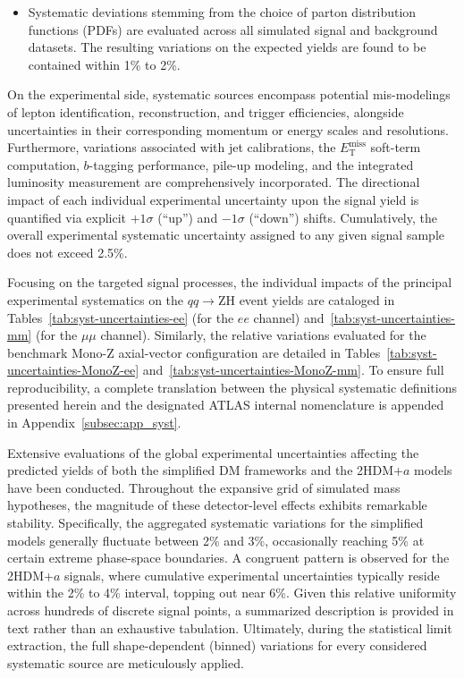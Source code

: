 \begin{itemize}
\item Systematic deviations stemming from the choice of parton distribution functions (PDFs) are evaluated across all simulated signal and background datasets. The resulting variations on the expected yields are found to be contained within 1\% to 2\%.

\end{itemize}

On the experimental side, systematic sources encompass potential mis-modelings of lepton identification, reconstruction, and trigger efficiencies, alongside uncertainties in their corresponding momentum or energy scales and resolutions. Furthermore, variations associated with jet calibrations, the $E_{\text{T}}^{\text{miss}}$ soft-term computation, $b$-tagging performance, pile-up modeling, and the integrated luminosity measurement are comprehensively incorporated. The directional impact of each individual experimental uncertainty upon the signal yield is quantified via explicit $+1\sigma$ (``up'') and $-1\sigma$ (``down'') shifts. Cumulatively, the overall experimental systematic uncertainty assigned to any given signal sample does not exceed 2.5\%.

Focusing on the targeted signal processes, the individual impacts of the principal experimental systematics on the $qq \to \text{ZH}$ event yields are cataloged in Tables~\ref{tab:syst-uncertainties-ee} (for the $ee$ channel) and~\ref{tab:syst-uncertainties-mm} (for the $\mu\mu$ channel). Similarly, the relative variations evaluated for the benchmark Mono-$\text{Z}$ axial-vector configuration are detailed in Tables~\ref{tab:syst-uncertainties-MonoZ-ee} and~\ref{tab:syst-uncertainties-MonoZ-mm}. To ensure full reproducibility, a complete translation between the physical systematic definitions presented herein and the designated ATLAS internal nomenclature is appended in Appendix~\ref{subsec:app_syst}.


Extensive evaluations of the global experimental uncertainties affecting the predicted yields of both the simplified DM frameworks and the 2HDM+$a$ models have been conducted. Throughout the expansive grid of simulated mass hypotheses, the magnitude of these detector-level effects exhibits remarkable stability. Specifically, the aggregated systematic variations for the simplified models generally fluctuate between 2\% and 3\%, occasionally reaching 5\% at certain extreme phase-space boundaries. A congruent pattern is observed for the 2HDM+$a$ signals, where cumulative experimental uncertainties typically reside within the 2\% to 4\% interval, topping out near 6\%. Given this relative uniformity across hundreds of discrete signal points, a summarized description is provided in text rather than an exhaustive tabulation. Ultimately, during the statistical limit extraction, the full shape-dependent (binned) variations for every considered systematic source are meticulously applied.

